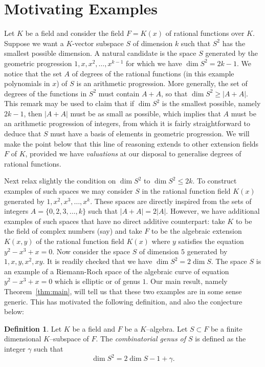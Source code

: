 \documentclass{article}
\theoremstyle{plain}
\theoremstyle{definition}
\newtheorem{defn}[thm]{Definition}
\theoremstyle{remark}
\renewcommand{\geq}{\geqslant}
\renewcommand{\leq}{\leqslant}
\begin{document}
\section{{Motivating Examples}}\label{sec:examples}
{
Let $K$ be a field and consider the field $F=K(x)$ of rational
functions over $K$. Suppose we want a $K$-vector subspace $S$ of
dimension $k$ such that $S^2$ has the smallest possible dimension.
A natural candidate is the space $S$ generated by the geometric
progression $1,x,x^2,\ldots ,x^{k-1}$ for which we have $\dim
S^2=2k-1$. 
We notice that the set $A$ of degrees of the rational functions 
(in this example polynomials in $x$) of $S$ is an arithmetic
progression. More generally, the set of degrees of the functions in
$S^2$ must contain $A+A$, so that $\dim S^2\geq |A+A|$. This remark
may be used to claim that if $\dim S^2$ is the smallest possible,
namely $2k-1$, then
$|A+A|$ must be as small as possible, which implies that $A$ must be
an arithmetic progression of integers, from which it is fairly straightforward to
deduce that $S$ must have a basis of elements in geometric
progression.
We will make the point below that this line of reasoning extends to
other extension fields $F$ of $K$, provided we have {\em valuations}
at our disposal to generalise degrees of rational functions.}

{
Next relax slightly the condition on $\dim S^2$ to $\dim S^2 \leq 2k$.
To construct examples of such spaces we may consider $S$ in the rational
function field $K(x)$
generated by $1,x^2,x^3,\ldots ,x^k$. These spaces are directly inspired from
the sets of integers $A=\{0,2,3,\ldots ,k\}$ such that $|A+A|=2|A|$.
However, we have additional examples of such spaces that have no
direct additive counterpart: take $K$ to be the field of complex
numbers (say) and take $F$ to be the algebraic extension $K(x,y)$ of
the rational function field $K(x)$ where $y$ satisfies the equation
$y^2-x^3+x=0$. Now consider the space $S$ of dimension $5$ generated by
$1,x,y,x^2,xy$. It is readily checked that we have $\dim S^2=2\dim S$.
The space $S$ is an example of a Riemann-Roch space of the algebraic curve
of equation $y^2-x^3+x=0$ which is elliptic or of genus $1$. Our main
result, namely Theorem~\ref{thm:main}, will tell us that these two
examples are in some sense generic. This has motivated the following
definition, and also the conjecture below:
}
\begin{defn}\label{def:gamma}
  {
  Let $K$ be a field and $F$ be a $K$--algebra. Let $S \subset F$ be a 
  finite dimensional $K$--subspace of $F$. The {\em combinatorial
  genus of $S$} is defined as the integer $\gamma$ such that
  $$
  \dim S^2 = 2\dim S - 1 + \gamma.
  $$
  }
\end{defn}
\end{document}
